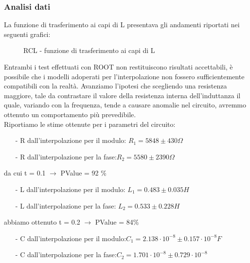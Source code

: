 \documentclass{article}
\theoremstyle{definition}
\begin{document}
\subsubsection*{Analisi dati}
La funzione di trasferimento ai capi di L presentava gli andamenti riportati nei seguenti grafici:

\begin{figure}[!h]
\caption{RCL - funzione di trasferimento ai capi di L}


\label{fig:RLC_su_L}
\end{figure}

\noindent Entrambi i test effettuati con ROOT non restituiscono risultati accettabili, è possibile che i modelli adoperati per l'interpolazione non fossero sufficientemente compatibili con la realtà. Avanziamo l'ipotesi che scegliendo una resistenza maggiore, tale da contrastare il valore della resistenza interna dell'induttanza il quale, variando con la frequenza, tende a causare anomalie nel circuito, avremmo ottenuto un comportamento più prevedibile. \\

\noindent Riportiamo le stime ottenute per i parametri del circuito: 
\begin{enumerate}
    \item [-] R dall'interpolazione per il modulo: \(R_{1} = 5848 \pm 430 \Omega\) 
    \item[-] R dall'interpolazione per la fase:\(R_{2} = 5580\pm 2390 \Omega\) 
\end{enumerate}

da cui t = 0.1 \(\rightarrow\) PValue = 92 \% \\

\begin{enumerate}
    \item[-] L dall'interpolazione per il modulo: \(L_{1} = 0.483 \pm 0.035  H\)
    \item[-]L dall'interpolazione per la fase: \(L_{2} = 0.533 \pm 0.228 H\)
\end{enumerate}
 
abbiamo ottenuto t = 0.2 \(\rightarrow\) PValue = 84\% \\

\begin{enumerate}
    \item[-] C dall'interpolazione per il modulo:\(C_{1} = 2.138\cdot 10^{-8} \pm 0.157\cdot 10^{-8} F\)
    \item[-] C dall'interpolazione per la fase:\(C_{2} = 1.701 \cdot 10^{-8} \pm 0.729 \cdot 10^{-8}\) 
\end{enumerate}
\end{document}
